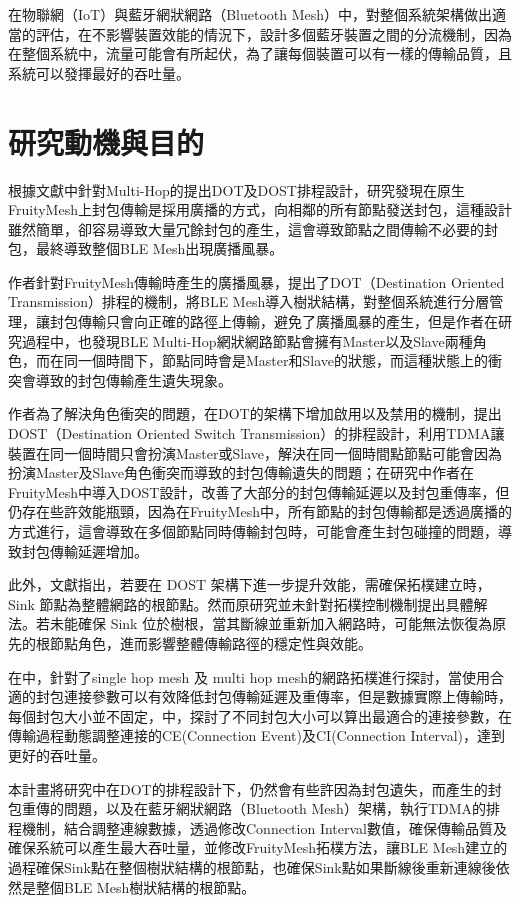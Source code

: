 \begin{ZhChapter}
在物聯網（IoT）與藍牙網狀網路（Bluetooth Mesh）中，對整個系統架構做出適當的評估，在不影響裝置效能的情況下，設計多個藍牙裝置之間的分流機制，因為在整個系統中，流量可能會有所起伏，為了讓每個裝置可以有一樣的傳輸品質，且系統可以發揮最好的吞吐量。
	

\section{研究動機與目的}

根據文獻\cite{112TIT00392032}中針對Multi-Hop的提出DOT及DOST排程設計，研究發現在原生FruityMesh上封包傳輸是採用廣播的方式，向相鄰的所有節點發送封包，這種設計雖然簡單，卻容易導致大量冗餘封包的產生，這會導致節點之間傳輸不必要的封包，最終導致整個BLE Mesh出現廣播風暴。

\cite{112TIT00392032}作者針對FruityMesh傳輸時產生的廣播風暴，提出了DOT（Destination Oriented Transmission）排程的機制，將BLE Mesh導入樹狀結構，對整個系統進行分層管理，讓封包傳輸只會向正確的路徑上傳輸，避免了廣播風暴的產生，但是作者在研究過程中，也發現BLE Multi-Hop網狀網路節點會擁有Master以及Slave兩種角色，而在同一個時間下，節點同時會是Master和Slave的狀態，而這種狀態上的衝突會導致的封包傳輸產生遺失現象。

\cite{112TIT00392032}作者為了解決角色衝突的問題，在DOT的架構下增加啟用以及禁用的機制，提出DOST（Destination Oriented Switch Transmission）的排程設計，利用TDMA讓裝置在同一個時間只會扮演Master或Slave，解決在同一個時間點節點可能會因為扮演Master及Slave角色衝突而導致的封包傳輸遺失的問題；在研究\cite{112TIT00392032}中作者在FruityMesh中導入DOST設計，改善了大部分的封包傳輸延遲以及封包重傳率，但仍存在些許效能瓶頸，因為在FruityMesh中，所有節點的封包傳輸都是透過廣播的方式進行，這會導致在多個節點同時傳輸封包時，可能會產生封包碰撞的問題，導致封包傳輸延遲增加。


此外，文獻指出，若要在 DOST 架構下進一步提升效能，需確保拓樸建立時，Sink 節點為整體網路的根節點。然而原研究並未針對拓樸控制機制提出具體解法。若未能確保 Sink 位於樹根，當其斷線並重新加入網路時，可能無法恢復為原先的根節點角色，進而影響整體傳輸路徑的穩定性與效能。

在\cite{112TIT00392032}\cite{110TIT00392037}中，針對了single hop mesh 及 multi hop mesh的網路拓樸進行探討，當使用合適的封包連接參數可以有效降低封包傳輸延遲及重傳率，但是數據實際上傳輸時，每個封包大小並不固定，\cite{109TIT00392031}中，探討了不同封包大小可以算出最適合的連接參數，在傳輸過程動態調整連接的CE(Connection Event)及CI(Connection Interval)，達到更好的吞吐量。

本計畫將研究中在DOT的排程設計下，仍然會有些許因為封包遺失，而產生的封包重傳的問題，以及在藍牙網狀網路（Bluetooth Mesh）架構，執行TDMA的排程機制，結合調整連線數據，透過修改Connection Interval數值，確保傳輸品質及確保系統可以產生最大吞吐量，並修改FruityMesh拓樸方法，讓BLE Mesh建立的過程確保Sink點在整個樹狀結構的根節點，也確保Sink點如果斷線後重新連線後依然是整個BLE Mesh樹狀結構的根節點。


\end{ZhChapter}

